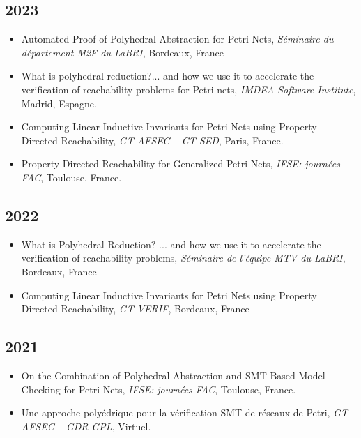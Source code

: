 \subsection*{2023}
\vspace{5pt}

\begin{itemize}
  \item Automated Proof of Polyhedral Abstraction for Petri Nets,
  \textit{Séminaire du département M2F du LaBRI}, Bordeaux, France

  \item What is polyhedral reduction?... and how we use it to accelerate the
  verification of reachability problems for Petri nets, \textit{IMDEA Software
  Institute}, Madrid, Espagne. 
  
  \item Computing Linear Inductive Invariants for Petri Nets using Property
  Directed Reachability, \textit{GT AFSEC -- CT SED}, Paris, France.

  \item Property Directed Reachability for Generalized Petri Nets, \textit{IFSE:
  journées FAC}, Toulouse, France.
\end{itemize}

\vspace{5pt}
\subsection*{2022}

\vspace{5pt}
\begin{itemize}
  \item What is Polyhedral Reduction? ... and how we use it to accelerate the
  verification of reachability problems, \textit{Séminaire de l'équipe MTV du
  LaBRI}, Bordeaux, France

  \item Computing Linear Inductive Invariants for Petri Nets using Property
  Directed Reachability, \textit{GT VERIF}, Bordeaux, France
\end{itemize}

\vspace{5pt}
\subsection*{2021}

\vspace{5pt}
\begin{itemize}
  \item On the Combination of Polyhedral Abstraction and SMT-Based Model
  Checking for Petri Nets, \textit{IFSE: journées FAC}, Toulouse, France.

  \item Une approche polyédrique pour la vérification SMT de réseaux de Petri,
  \textit{GT AFSEC -- GDR GPL}, Virtuel.
\end{itemize}


